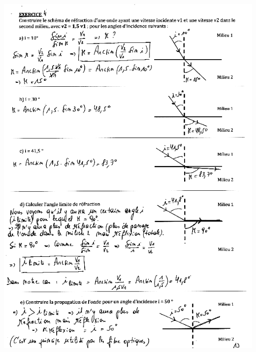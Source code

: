 \includegraphics[width=18.501cm,height=25.636cm]{Pictures/100000010000026D0000035CCC97A4EC19D02B04.png}

